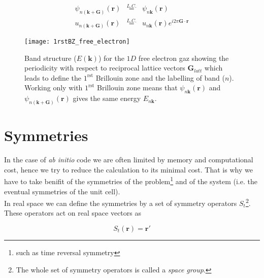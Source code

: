 \documentclass[a4paper,12pt]{report}
\begin{document}
\begin{eqnarray}
\psi_{n(\mathbf{k}+\mathbf{G})}(\mathbf{r}) &\stackrel{L.C.}{=}& \psi_{n\mathbf{k}}(\mathbf{r}) \\
u_{n(\mathbf{k}+\mathbf{G})}(\mathbf{r}) &\stackrel{L.C.}{=}& u_{n\mathbf{k}}(\mathbf{r}) e^{i2\pi \mathbf{G}\cdotp\mathbf{r}}
\end{eqnarray}

\begin{figure}[!h]
\centering
\begin{minipage}[c]{0.69\textwidth}
\texttt{[image: 1rstBZ\_free\_electron]}
\end{minipage}
\vspace{0.05\textwidth}
\begin{minipage}[c]{1.0\textwidth}
\caption{\small Band structure ($E(\mathbf{k})$) for the $1D$ free electron gaz showing the periodicity with respect to reciprocal lattice vectors $\mathbf{G}_{latt}$ which leads to define the $1^{\text{rst}}$ Brillouin zone and the labelling of band ($n$). Working only with $1^{\text{rst}}$ Brillouin zone means that $\psi_{n\mathbf{k}} (\mathbf{r})$ and $\psi_{n(\mathbf{k}+\mathbf{G})}(\mathbf{r})$ gives the same energy $E_{n\mathbf{k}}$.}
\label{figband_1rstBZ}
\end{minipage}
\end{figure}


\section{Symmetries}
\label{section1_2}

In the case of \textit{ab initio} code we are often limited by memory and computational cost, hence we try to reduce the calculation to its minimal cost. That is why we have to take benifit of the symmetries of the problem\footnote{such as time reversal symmetry} and of the system (i.e. the eventual symmetries of the unit cell).\\
In real space we can define the symmetries by a set of symmetry operators $S_{t}$\footnote{The whole set of symmetry operators is called a \textit{space group}.}\cite{burns_glazer_90}. These operators act on real space vectors as

\begin{equation}
S_{t}(\mathbf{r}) = \mathbf{r}'
\end{equation}
\end{document}

